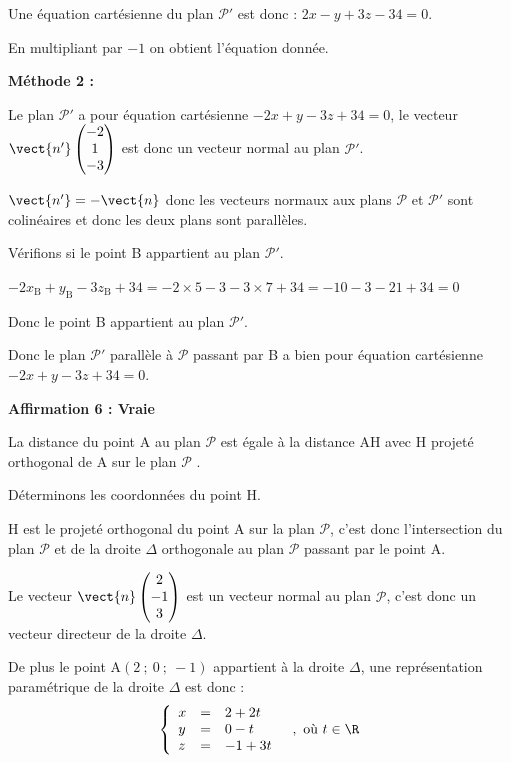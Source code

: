 Une équation cartésienne du plan $\mathcal{P}'$ est donc : $2x-y+3z-34=0$.

En multipliant par $-1$ on obtient l'équation donnée.

\smallskip

\textbf{Méthode 2 :}

Le plan $\mathcal{P}'$ a pour équation cartésienne $-2x + y - 3z + 34 = 0$, le vecteur $\vect{n'}\begin{pmatrix}-2\\1\\-3\end{pmatrix}$ est donc un vecteur normal au plan $\mathcal{P}'$.

$\vect{n'}=-\vect{n}$ donc les vecteurs normaux aux plans $\mathcal{P}$ et $\mathcal{P}'$ sont colinéaires et donc les deux plans sont parallèles.

Vérifions si le point B appartient au plan  $\mathcal{P}'$.

$-2x_{\mathrm{B}} + y_{\mathrm{B}} - 3z_{\mathrm{B}} + 34 = -2 \times 5 -3 -3 \times 7 +34 = -10-3-21+34 = 0$

Donc le point B appartient au plan  $\mathcal{P}'$.

Donc le plan $\mathcal{P}'$ parallèle à $\mathcal{P}$ passant par B a bien pour équation cartésienne \linebreak$-2x + y - 3z + 34 = 0$.

\textbf{Affirmation 6 : Vraie}

 La distance du point A au plan $\mathcal{P}$ est égale à la distance AH avec H projeté orthogonal de A sur le plan $\mathcal{P}$ .

Déterminons les coordonnées du point H.

H est le projeté orthogonal du point A sur la plan $\mathcal{P}$, c'est donc l'intersection du plan $\mathcal{P}$ et de la droite $\Delta$ orthogonale au plan $\mathcal{P}$ passant par le point A.

Le vecteur $\vect{n}\begin{pmatrix}2\\-1\\3\end{pmatrix}$ est un vecteur normal au plan $\mathcal{P}$, c'est donc un vecteur directeur de la droite $\Delta$.

De plus le point A$(2~;~0~;~-1)$ appartient à la droite $\Delta$, une représentation paramétrique de la droite $\Delta$ est donc :
\[\left\{\begin{array}{lcl}
x&=&2+2t \\
y&=&0 -t \\
z&=&-1+3t
\end{array} \quad, \text { où } t \in \R\right.\]


